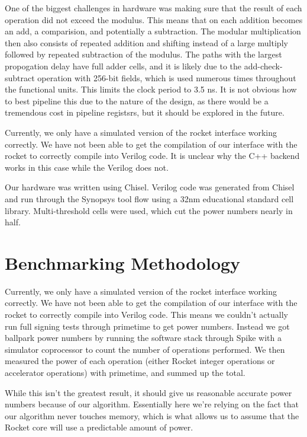 \documentclass[twocolumn]{article}
\begin{document}
One of the biggest challenges in hardware was making sure that the
result of each operation did not exceed the modulus. This means that
on each addition becomes an add, a comparision, and potentially a
subtraction. The modular multiplication then also consists of repeated
addition and shifting instead of a large multiply followed by repeated
subtraction of the modulus. The paths with the largest propogation
delay have full adder cells, and it is likely due to the
add-check-subtract operation with 256-bit fields, which is used
numerous times throughout the functional units. This limits the clock
period to 3.5 ns. It is not obvious how to best pipeline this due to
the nature of the design, as there would be a tremendous cost in
pipeline registsrs, but it should be explored in the future.

Currently, we only have a simulated version of the rocket interface
working correctly.  We have not been able to get the compilation of
our interface with the rocket to correctly compile into Verilog
code. It is unclear why the C++ backend works in this case while the
Verilog does not.

Our hardware was written using Chisel. Verilog code was generated from
Chisel and run through the Synopsys tool flow using a 32nm educational
standard cell library. Multi-threshold cells were used, which cut the
power numbers nearly in half.

\section{Benchmarking Methodology}

Currently, we only have a simulated version of the rocket interface
working correctly.  We have not been able to get the compilation of
our interface with the rocket to correctly compile into Verilog code.
This means we couldn't actually run full signing tests through
primetime to get power numbers.  Instead we got ballpark power numbers
by running the software stack through Spike with a simulator
coprocessor to count the number of operations performed.  We then
measured the power of each operation (either Rocket integer operations
or accelerator operations) with primetime, and summed up the total.

While this isn't the greatest result, it should give us reasonable
accurate power numbers because of our algorithm.  Essentially here
we're relying on the fact that our algorithm never touches memory,
which is what allows us to assume that the Rocket core will use a
predictable amount of power.
\end{document}
